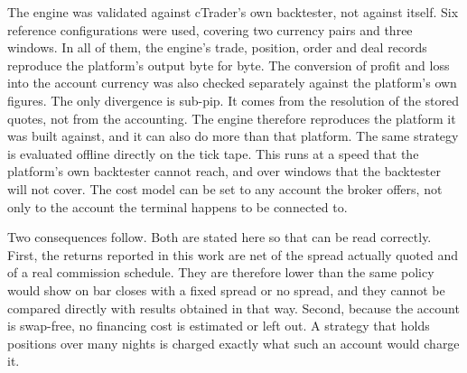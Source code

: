 The engine was validated against cTrader's own backtester, not against itself. Six reference configurations were used, covering two currency pairs and three windows. In all of them, the engine's trade, position, order and deal records reproduce the platform's output byte for byte. The conversion of profit and loss into the account currency was also checked separately against the platform's own figures. The only divergence is sub-pip. It comes from the resolution of the stored quotes, not from the accounting. The engine therefore reproduces the platform it was built against, and it can also do more than that platform. The same strategy is evaluated offline directly on the tick tape. This runs at a speed that the platform's own backtester cannot reach, and over windows that the backtester will not cover. The cost model can be set to any account the broker offers, not only to the account the terminal happens to be connected to.

Two consequences follow. Both are stated here so that  can be read correctly. First, the returns reported in this work are net of the spread actually quoted and of a real commission schedule. They are therefore lower than the same policy would show on bar closes with a fixed spread or no spread, and they cannot be compared directly with results obtained in that way. Second, because the account is swap-free, no financing cost is estimated or left out. A strategy that holds positions over many nights is charged exactly what such an account would charge it.